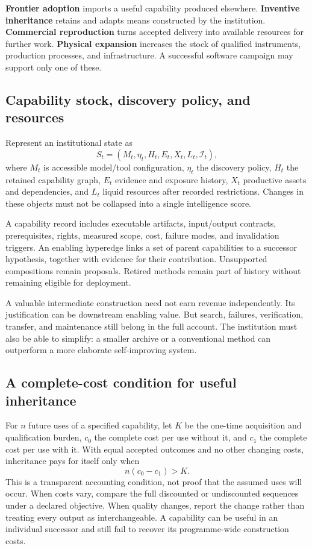 \documentclass[11pt,letterpaper]{article}
\newcommand{\I}{\mathcal{I}}
\theoremstyle{remark}\newtheorem{remark}{Remark}[section]
\begin{document}
\textbf{Frontier adoption} imports a useful capability produced elsewhere. \textbf{Inventive inheritance} retains and adapts means constructed by the institution. \textbf{Commercial reproduction} turns accepted delivery into available resources for further work. \textbf{Physical expansion} increases the stock of qualified instruments, production processes, and infrastructure. A successful software campaign may support only one of these.

\subsection{Capability stock, discovery policy, and resources}
Represent an institutional state as
\begin{equation}
S_t=(M_t,\eta_t,H_t,E_t,X_t,L_t,\I_t),
\end{equation}
where $M_t$ is accessible model/tool configuration, $\eta_t$ the discovery policy, $H_t$ the retained capability graph, $E_t$ evidence and exposure history, $X_t$ productive assets and dependencies, and $L_t$ liquid resources after recorded restrictions. Changes in these objects must not be collapsed into a single intelligence score.

A capability record includes executable artifacts, input/output contracts, prerequisites, rights, measured scope, cost, failure modes, and invalidation triggers. An enabling hyperedge links a set of parent capabilities to a successor hypothesis, together with evidence for their contribution. Unsupported compositions remain proposals. Retired methods remain part of history without remaining eligible for deployment.

A valuable intermediate construction need not earn revenue independently. Its justification can be downstream enabling value. But search, failures, verification, transfer, and maintenance still belong in the full account. The institution must also be able to simplify: a smaller archive or a conventional method can outperform a more elaborate self-improving system.

\subsection{A complete-cost condition for useful inheritance}
For $n$ future uses of a specified capability, let $K$ be the one-time acquisition and qualification burden, $c_0$ the complete cost per use without it, and $c_1$ the complete cost per use with it. With equal accepted outcomes and no other changing costs, inheritance pays for itself only when
\begin{equation}
n(c_0-c_1)>K.
\label{eq:reuse}
\end{equation}
This is a transparent accounting condition, not proof that the assumed uses will occur. When costs vary, compare the full discounted or undiscounted sequences under a declared objective. When quality changes, report the change rather than treating every output as interchangeable. A capability can be useful in an individual successor and still fail to recover its programme-wide construction costs.
\end{document}
